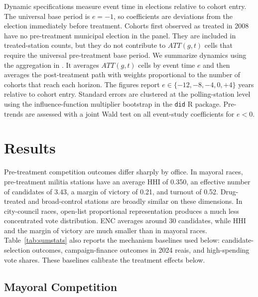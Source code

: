 \documentclass[11pt]{article}
\begin{document}
Dynamic specifications measure event time in elections relative to cohort entry. The universal base period is $e = -1$, so coefficients are deviations from the election immediately before treatment. Cohorts first observed as treated in 2008 have no pre-treatment municipal election in the panel. They are included in treated-station counts, but they do not contribute to $ATT(g,t)$ cells that require the universal pre-treatment base period. We summarize dynamics using the aggregation in \citet{callaway2021did}. It averages $ATT(g,t)$ cells by event time $e$ and then averages the post-treatment path with weights proportional to the number of cohorts that reach each horizon. The figures report $e \in \{-12, -8, -4, 0, +4\}$ years relative to cohort entry. Standard errors are clustered at the polling-station level using the influence-function multiplier bootstrap in the \texttt{did} R package. Pre-trends are assessed with a joint Wald test on all event-study coefficients for $e < 0$.

\section{Results}\label{sec:results}

Pre-treatment competition outcomes differ sharply by office. In mayoral races, pre-treatment militia stations have an average HHI of 0.350, an effective number of candidates of 3.43, a margin of victory of 0.21, and turnout of 0.52. Drug-treated and broad-control stations are broadly similar on these dimensions. In city-council races, open-list proportional representation produces a much less concentrated vote distribution. ENC averages around 30 candidates, while HHI and the margin of victory are much smaller than in mayoral races. Table~\ref{tab:sumstats} also reports the mechanism baselines used below: candidate-selection outcomes, campaign-finance outcomes in 2024 reais, and high-spending vote shares. These baselines calibrate the treatment effects below.



\subsection{Mayoral Competition}\label{sec:prefeito_results}
\end{document}

